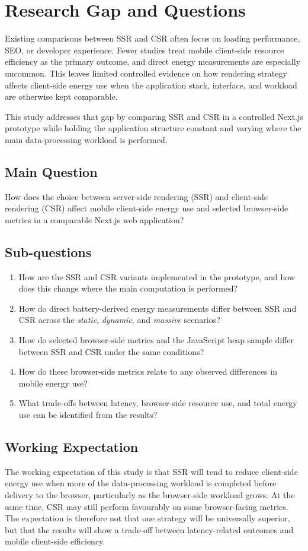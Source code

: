 \section{Research Gap and Questions}

Existing comparisons between SSR and CSR often focus on loading performance, SEO, or developer experience. Fewer studies treat mobile client-side resource efficiency as the primary outcome, and direct energy measurements are especially uncommon. This leaves limited controlled evidence on how rendering strategy affects client-side energy use when the application stack, interface, and workload are otherwise kept comparable.

This study addresses that gap by comparing SSR and CSR in a controlled Next.js prototype while holding the application structure constant and varying where the main data-processing workload is performed.

\subsection{Main Question}

How does the choice between server-side rendering (SSR) and client-side rendering (CSR) affect mobile client-side energy use and selected browser-side metrics in a comparable Next.js web application?

\subsection{Sub-questions}

\begin{enumerate}
	\item How are the SSR and CSR variants implemented in the prototype, and how does this change where the main computation is performed?
	\item How do direct battery-derived energy measurements differ between SSR and CSR across the \textit{static}, \textit{dynamic}, and \textit{massive} scenarios?
	\item How do selected browser-side metrics and the JavaScript heap sample differ between SSR and CSR under the same conditions?
	\item How do these browser-side metrics relate to any observed differences in mobile energy use?
	\item What trade-offs between latency, browser-side resource use, and total energy use can be identified from the results?
\end{enumerate}

\subsection*{Working Expectation}

The working expectation of this study is that SSR will tend to reduce client-side energy use when more of the data-processing workload is completed before delivery to the browser, particularly as the browser-side workload grows. At the same time, CSR may still perform favourably on some browser-facing metrics. The expectation is therefore not that one strategy will be universally superior, but that the results will show a trade-off between latency-related outcomes and mobile client-side efficiency.
